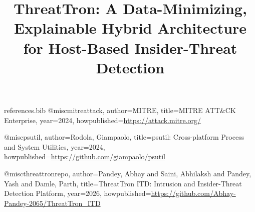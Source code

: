 \begin{filecontents*}{references.bib}
@misc{mitreattack,
  author={{MITRE}},
  title={{MITRE ATT\&CK} Enterprise},
  year={2024},
  howpublished={\url{https://attack.mitre.org/}}}

@misc{psutil,
  author={Rodola, Giampaolo},
  title={psutil: Cross-platform Process and System Utilities},
  year={2024},
  howpublished={\url{https://github.com/giampaolo/psutil}}}

@misc{threattronrepo,
  author={Pandey, Abhay and Saini, Abhilaksh and Pandey, Yash and Damle, Parth},
  title={ThreatTron ITD: Intrusion and Insider-Threat Detection Platform},
  year={2026},
  howpublished={\url{https://github.com/Abhay-Pandey-2065/ThreatTron_ITD}}}
\end{filecontents*}

\documentclass[conference]{IEEEtran}
\usepackage{cite}
\usepackage{amsmath,amssymb}
\usepackage{booktabs}
\usepackage{array}
\usepackage{multirow}
\usepackage{graphicx}
\usepackage{xcolor}
\usepackage{url}
\usepackage{hyperref}
\usepackage{tikz}
\usetikzlibrary{arrows.meta,positioning,fit,shapes.geometric,calc}
\hypersetup{colorlinks=true,linkcolor=blue,citecolor=blue,urlcolor=blue}
\newcommand{\ThreatTron}{\textsc{ThreatTron}}

\title{ThreatTron: A Data-Minimizing, Explainable Hybrid Architecture for Host-Based Insider-Threat Detection}

\author{
}


\maketitle

